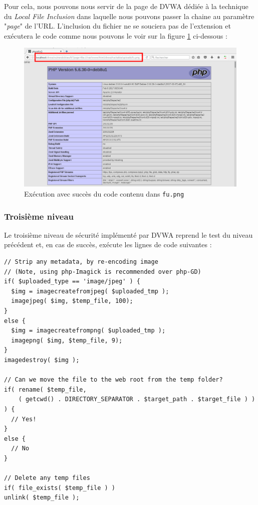 Pour cela, nous pouvons nous servir de la page de DVWA dédiée à la technique du \textit{Local File Inclusion} dans laquelle nous pouvons passer la chaine  au paramètre "\textit{page}" de l'URL. L'inclusion du fichier ne se souciera pas de l'extension et exécutera le code comme nous pouvons le voir sur la figure \ref{fu_dvwa7} ci-dessous :

\begin{figure}[!h]
\begin{center}
\includegraphics[scale=.35]{images/fu7.png}

\caption{Exécution avec succès du code contenu dans \texttt{fu.png}}
\label{fu_dvwa7}
\end{center}
\end{figure}

\subsubsection{Troisième niveau}

Le troisième niveau de sécurité implémenté par DVWA reprend le test du niveau précédent et, en cas de succès, exécute les lignes de code suivantes :

\begin{lstlisting}
// Strip any metadata, by re-encoding image 
// (Note, using php-Imagick is recommended over php-GD)
if( $uploaded_type == 'image/jpeg' ) {
  $img = imagecreatefromjpeg( $uploaded_tmp );
  imagejpeg( $img, $temp_file, 100);
}
else {
  $img = imagecreatefrompng( $uploaded_tmp );
  imagepng( $img, $temp_file, 9);
}
imagedestroy( $img );

// Can we move the file to the web root from the temp folder?
if( rename( $temp_file, 
    ( getcwd() . DIRECTORY_SEPARATOR . $target_path . $target_file ) ) ) {
  // Yes!
}
else {
  // No
}

// Delete any temp files
if( file_exists( $temp_file ) )
unlink( $temp_file ); 
        
\end{lstlisting}

